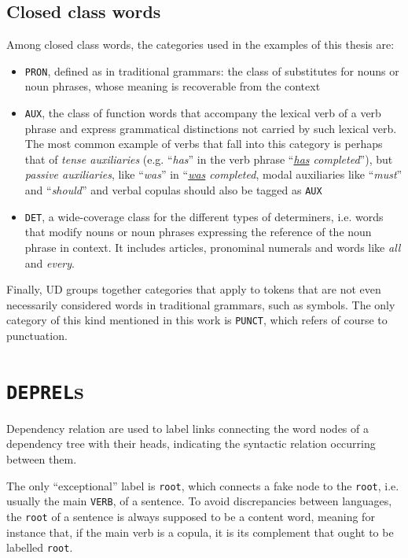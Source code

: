 \subsection{Closed class words} \label{cc}
Among closed class words, the categories used in the examples of this thesis are: \smallskip
\begin{itemize}
    \item \texttt{PRON}, defined as in traditional grammars: the class of substitutes for nouns or noun phrases, whose meaning is recoverable from the context
    \item \texttt{AUX}, the class of function words that accompany the lexical verb of a verb phrase and express grammatical distinctions not carried by such lexical verb. The most common example of verbs that fall into this category is perhaps that of \textit{tense auxiliaries} (e.g. ``\textit{has}'' in the verb phrase ``\textit{\underline{has} completed}''), but \textit{passive auxiliaries}, like ``\textit{was}'' in ``\textit{\underline{was} completed}, modal auxiliaries like ``\textit{must}'' and ``\textit{should}'' and verbal copulas should also be tagged as \texttt{AUX}
    \item \texttt{DET}, a wide-coverage class for the different types of determiners, i.e. words that modify nouns or noun phrases expressing the reference of the noun phrase in context. It includes articles, pronominal numerals and words like \textit{all} and \textit{every}.
\end{itemize} \smallskip \smallskip

Finally, UD groups together categories that apply to tokens that are not even necessarily considered words in traditional grammars, such as symbols. The only category of this kind mentioned in this work is \texttt{PUNCT}, which refers of course to punctuation.

\section{\texttt{DEPREL}s} \label{a_lab}
Dependency relation are used to label links connecting the word nodes of a dependency tree with their heads, indicating the syntactic relation occurring between them. \smallskip

The only ``exceptional'' label is \texttt{root}, which connects a fake node to the \texttt{root}, i.e. usually the main \texttt{VERB}, of a sentence. To avoid discrepancies between languages, the \texttt{root} of a sentence is always supposed to be a content word, meaning for instance that, if the main verb is a copula, it is its complement that ought to be labelled \texttt{root}.

